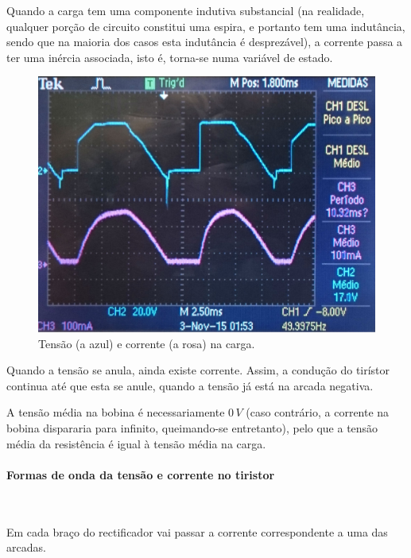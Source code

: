 \documentclass[a4paper,11pt]{article}
\numberwithin{equation}{section}
\begin{document}
Quando a carga tem uma componente indutiva substancial (na realidade, qualquer porção de circuito constitui uma espira, e portanto tem uma indutância, sendo que na maioria dos casos esta indutância é desprezável), a corrente passa a ter uma inércia associada, isto é, torna-se numa variável de estado.

\begin{figure}[H]
	\centering
	\includegraphics[keepaspectratio=true, scale=0.15]{img/DSC_0184}
	\caption{Tensão (a azul) e corrente (a rosa) na carga.}
	\label{fig:tcentradalacuna}
	\vspace{-0.8em}
\end{figure}

Quando a tensão se anula, ainda existe corrente. Assim, a condução do tirístor continua até que esta se anule, quando a tensão já está na arcada negativa.

A tensão média na bobina é necessariamente $0\,V$ (caso contrário, a corrente na bobina dispararia para infinito, queimando-se entretanto), pelo que a tensão média da resistência é igual à tensão média na carga.

\paragraph{Formas de onda da tensão e corrente no tiristor} \mbox{}\

Em cada braço do rectificador vai passar a corrente correspondente a uma das arcadas.
\end{document}
